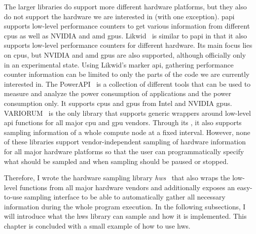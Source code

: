The larger libraries do support more different hardware platforms, but they also do not support the hardware we are interested in (with one exception). 
\gls{papi}~\cite{mucci_papi_1999} supports low-level performance counters to get various information from different \glspl{cpu} as well as NVIDIA and \gls{amd} \glspl{gpu}. 
Likwid~\cite{thomas_gruber_likwid_2023} is similar to \gls{papi} in that it also supports low-level performance counters for different hardware. 
Its main focus lies on \glspl{cpu}, but NVIDIA and \gls{amd} \glspl{gpu} are also supported, although officially only in an experimental state. 
Using Likwid's marker \gls{api}, gathering performance counter information can be limited to only the parts of the code we are currently interested in. 
The PowerAPI~\cite{fieni_powerapi_2024} is a collection of different tools that can be used to measure and analyze the power consumption of applications and the power consumption only. 
It supports \glspl{cpu} and \glspl{gpu} from Intel and NVIDIA \glspl{gpu}. 
VARIORUM~\cite{noauthor_variorum_2024} is the only library that supports generic wrappers around low-level \gls{api} functions for all major \gls{cpu} and \gls{gpu} vendors. 
Through its , it also supports sampling information of a whole compute node at a fixed interval. 
However, none of these libraries support vendor-independent sampling of hardware information for all major hardware platforms so that the user can programmatically specify what should be sampled and when sampling should be paused or stopped. 

Therefore, I wrote the hardware sampling library \textit{hws}~\cite{breyer_hws_2024-1, breyer_hardware-independent_2024, breyer_hws_2024} that also wraps the low-level functions from all major hardware vendors and additionally exposes an easy-to-use sampling interface to be able to automatically gather all necessary information during the whole program execution. 
In the following subsections, I will introduce what the hws library can sample and how it is implemented. 
This chapter is concluded with a small example of how to use hws. 

